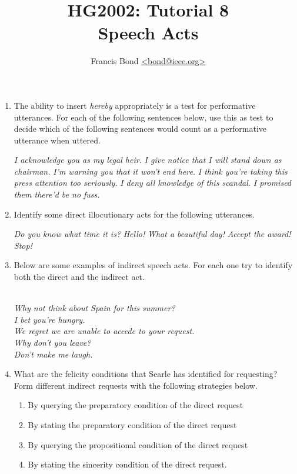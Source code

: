 \documentclass[a4paper]{article}
\title{HG2002: Tutorial 8\\  Speech Acts}
\author{Francis Bond \url{<bond@ieee.org>}}
\date{}%
\begin{document}
\maketitle

\begin{enumerate}

\item The ability to insert \textit{hereby} appropriately is a test for performative utterances. For each of the following sentences below, use this as test to decide which of the following sentences would count as a performative utterance when uttered. 
  \begin{exe}
  \ex \textit{I acknowledge you as my legal heir.}
  \ex \textit{I give notice that I will stand down as chairman.}
  \ex \textit{I'm warning you that it won't end here.}
  \ex \textit{I think you're taking this press attention too seriously.}
  \ex \textit{I deny all knowledge of this scandal.}
  \ex \textit{I promised them there'd be no fuss.}
\end{exe}
\item Identify some direct illocutionary acts for the following utterances.
 \begin{exe}
  \ex \textit{Do you know what time it is?}
  \ex \textit{Hello! }
  \ex \textit{What a beautiful day!}
  \ex \textit{Accept the award!}
  \ex \textit{Stop!}
\end{exe}

\item Below are some examples of indirect speech acts. For each one try to identify both the direct and the indirect act.
 \begin{exe}
\\ \textit{Why not think about Spain for this summer?}
\\ \textit{I bet you're hungry.}
\\ \textit{We regret we are unable to accede to your request.}
\\ \textit{Why don't you leave?}
\\ \textit{Don't make me laugh.}
\end{exe}

\item What are the felicity conditions that Searle has identified for requesting? Form different indirect requests with the following strategies below.
  \begin{enumerate}
  \item By querying the preparatory condition of the direct request
  \item By stating the preparatory condition of the direct request
  \item By querying the propositional condition of the direct request
  \item By stating the sincerity condition of the direct request.
  \end{enumerate}


\end{enumerate}
\end{document}
